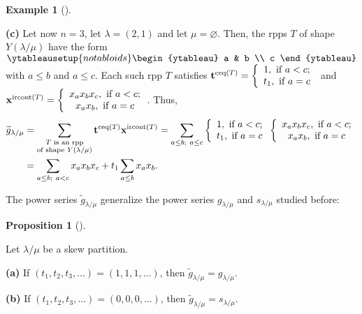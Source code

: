 \documentclass[numbers=enddot,12pt,final,onecolumn,notitlepage]{scrartcl}%
\theoremstyle{definition}
\newtheorem{prop}[theo]{Proposition}
\newenvironment{proposition}[1][]
{\begin{prop}[#1]\begin{leftbar}}
{\end{leftbar}\end{prop}}
\newtheorem{exmp}[theo]{Example}
\newenvironment{example}[1][]
{\begin{exmp}[#1]\begin{leftbar}}
{\end{leftbar}\end{exmp}}
\let\sumnonlimits\sum
\renewcommand{\sum}{\sumnonlimits\limits}
\begin{document}
\begin{example}
\textbf{(c)} Let now $n=3$, let $\lambda=\left(  2,1\right)  $ and let
$\mu=\varnothing$. Then, the rpps $T$ of shape $Y\left(  \lambda/\mu\right)  $
have the form $%
\ytableausetup{notabloids}
\begin{ytableau}
a & b \\
c
\end{ytableau}%
$ with $a\leq b$ and $a\leq c$. Each such rpp $T$ satisfies $\mathbf{t}%
^{\operatorname*{ceq}\left(  T\right)  }=\left\{
\begin{array}
[c]{c}%
1,\text{ if }a<c;\\
t_{1},\text{ if }a=c
\end{array}
\right.  $ and $\mathbf{x}^{\operatorname*{ircont}\left(  T\right)  }=\left\{
%
\begin{array}
[c]{c}%
x_{a}x_{b}x_{c},\ \text{if }a<c;\\
x_{a}x_{b},\ \text{if }a=c
\end{array}
\right.  $. Thus,%
\begin{align*}
\widetilde{g}_{\lambda/\mu}  &  =\sum_{\substack{T\text{ is an rpp}\\\text{of
shape }Y\left(  \lambda/\mu\right)  }}\mathbf{t}^{\operatorname*{ceq}\left(
T\right)  }\mathbf{x}^{\operatorname*{ircont}\left(  T\right)  }=\sum_{a\leq
b;\ a\leq c}\left\{
\begin{array}
[c]{c}%
1,\text{ if }a<c;\\
t_{1},\text{ if }a=c
\end{array}
\right.  \left\{
\begin{array}
[c]{c}%
x_{a}x_{b}x_{c},\ \text{if }a<c;\\
x_{a}x_{b},\ \text{if }a=c
\end{array}
\right. \\
&  =\sum_{a\leq b;\ a<c}x_{a}x_{b}x_{c}+t_{1}\sum_{a\leq b}x_{a}x_{b}.
\end{align*}

\end{example}

The power series $\widetilde{g}_{\lambda/\mu}$ generalize the power series
$g_{\lambda/\mu}$ and $s_{\lambda/\mu}$ studied before:

\begin{proposition}
\label{prop.gtilde.gener}Let $\lambda/\mu$ be a skew partition.

\textbf{(a)} If $\left(  t_{1},t_{2},t_{3},\ldots\right)  =\left(
1,1,1,\ldots\right)  $, then $\widetilde{g}_{\lambda/\mu}=g_{\lambda/\mu}$.

\textbf{(b)} If $\left(  t_{1},t_{2},t_{3},\ldots\right)  =\left(
0,0,0,\ldots\right)  $, then $\widetilde{g}_{\lambda/\mu}=s_{\lambda/\mu}$.
\end{proposition}
\end{document}
